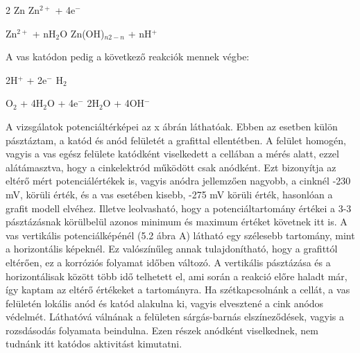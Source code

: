 2 Zn  Zn$^{2+}$ + 4e$^-$ 

Zn$^{2+}$ + nH$_2$O \longrightarrow Zn(OH)$_{n2-n}$ + nH$^+$


A vas katódon pedig a következő reakciók mennek végbe:


2H$^+$ + 2e$^-$ \longrightarrow H$_2$

O$_2$ + 4H$_2$O + 4e$^-$ \longrightarrow 2H$_2$O + 4OH$^-$

A vizsgálatok potenciáltérképei az x ábrán láthatóak. Ebben az esetben külön pásztáztam, a katód és anód felületét a grafittal ellentétben. A felület homogén, vagyis a vas egész felülete katódként viselkedett a cellában a mérés alatt, ezzel alátámasztva, hogy a cinkelektród működött csak anódként. Ezt bizonyítja az eltérő mért potenciálértékek is, vagyis anódra jellemzően nagyobb, a cinknél -230 mV, körüli érték, és a vas esetében kisebb, -275 mV körüli érték, hasonlóan a grafit modell elvéhez. Illetve leolvasható, hogy a potenciáltartomány értékei a 3-3 pásztázásnak körülbelül azonos minimum és maximum értéket követnek itt is. A vas vertikális potenciálképénél (5.2 ábra A) látható egy szélesebb tartomány, mint a horizontális képeknél. Ez valószínűleg annak tulajdonítható, hogy a grafittól eltérően, ez a korróziós folyamat időben változó. A vertikális pásztázása és a horizontálisak között több idő telhetett el, ami során a reakció előre haladt már, így kaptam az eltérő értékeket a tartományra. Ha szétkapcsolnánk a cellát, a vas felületén lokális anód és katód alakulna ki, vagyis elvesztené a cink anódos védelmét. Láthatóvá válnának a felületen sárgás-barnás elszíneződések, vagyis a rozsdásodás folyamata beindulna. Ezen részek anódként viselkednek, nem tudnánk itt katódos aktivitást kimutatni. 



